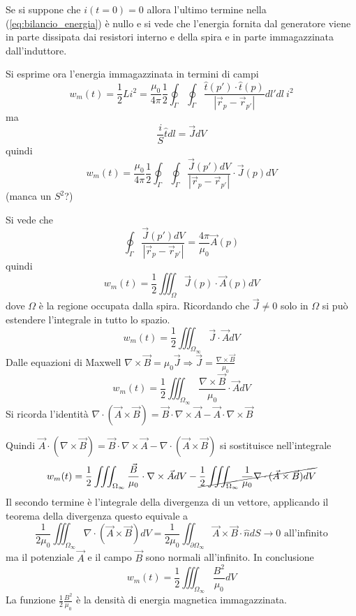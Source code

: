 Se si suppone che $i(t=0) = 0$ allora l'ultimo termine nella (\ref{eq:bilancio_energia}) è 
nullo e si vede che l'energia fornita dal generatore viene in parte dissipata dai resistori
interno e della spira e in parte immagazzinata dall'induttore.

Si esprime ora l'energia immagazzinata in termini di campi
$$
w_m(t) = \frac{1}{2}Li^2 = \frac{\mu_0}{4\pi}\frac{1}{2}\oint_\Gamma\oint_\Gamma \frac{\hat{t}(p')\cdot\hat{t}(p)}{|\vec{r}_p-\vec{r}_{p'}|}dl'dl\ i^2
$$
ma
$$
\frac{i}{S}\hat{t}dl = \vec{J}dV
$$
quindi
$$
w_m(t) = \frac{\mu_0}{4\pi}\frac{1}{2}\oint_\Gamma\oint_\Gamma \frac{\vec{J}(p')dV}{|\vec{r}_p-\vec{r}_{p'}|}\cdot \vec{J}(p)dV
$$
(manca un $S^2$?)

Si vede che 
$$
\oint_\Gamma \frac{\vec{J}(p')dV}{|\vec{r}_p-\vec{r}_{p'}|} = \frac{4\pi}{\mu_0}\vec{A}(p)
$$
quindi
$$
w_m(t) = \frac{1}{2}\iiint_\Omega \vec{J}(p)\cdot\vec{A}(p)dV
$$
dove $\Omega$ è la regione occupata dalla spira. Ricordando che $\vec{J} \neq 0$ solo in 
$\Omega$ si può estendere l'integrale in tutto lo spazio.
$$
w_m(t) = \frac{1}{2}\iiint_{\Omega_\infty} \vec{J}\cdot\vec{A}dV
$$
Dalle equazioni di Maxwell $\nabla\times\vec{B} = \mu_0\vec{J} \Rightarrow \vec{J} = \frac{\nabla\times\vec{B}}{\mu_0}$
$$
w_m(t) = \frac{1}{2}\iiint_{\Omega_\infty} \frac{\nabla\times\vec{B}}{\mu_0}\cdot\vec{A}dV
$$
Si ricorda l'identità $\nabla\cdot(\vec{A}\times\vec{B}) = \vec{B}\cdot\nabla\times\vec{A}
- \vec{A}\cdot\nabla\times\vec{B}$

Quindi $\vec{A}\cdot(\nabla\times\vec{B}) = \vec{B}\cdot\nabla\times\vec{A} - \nabla\cdot(\vec{A}\times\vec{B})$ si sostituisce nell'integrale
$$
w_m(t) = \frac{1}{2}\iiint_{\Omega_\infty}\frac{\vec{B}}{\mu_0}\cdot\nabla\times\vec{A} dV - \cancel{\frac{1}{2}\iiint_{\Omega_\infty}\frac{1}{\mu_0} \nabla\cdot(\vec{A}\times\vec{B})dV}
$$
Il secondo termine è l'integrale della divergenza di un vettore, applicando il teorema
della divergenza questo equivale a
$$
\frac{1}{2\mu_0}\iiint_{\Omega_\infty} \nabla\cdot(\vec{A}\times\vec{B})dV = \frac{1}{2\mu_0}\iint_{\partial\Omega_\infty} \vec{A}\times\vec{B}\cdot\hat{n}dS \to 0 \text{ all'infinito}
$$
ma il potenziale $\vec{A}$ e il campo $\vec{B}$ sono normali all'infinito. 
In conclusione
$$
w_m(t) = \frac{1}{2}\iiint_{\Omega_\infty} \frac{B^2}{\mu_0}dV
$$
La funzione $\frac{1}{2}\frac{B^2}{\mu_0} $ è la densità di energia magnetica 
immagazzinata.
\newpage
